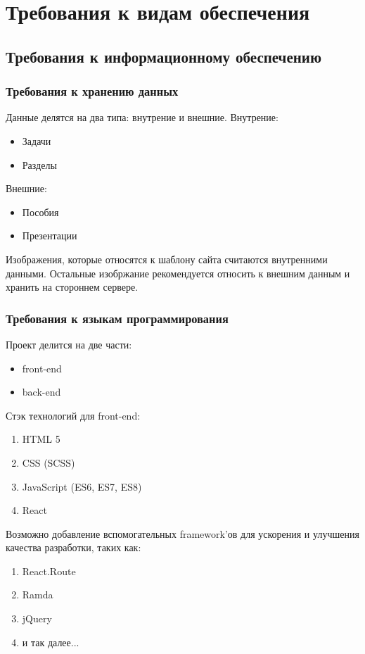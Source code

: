 \section{Требования к видам обеспечения}
\subsection{Требования к информационному обеспечению}
\subsubsection{Требования к хранению данных}
Данные делятся на два типа: внутрение и внешние.
Внутрение:
\begin{itemize}
    \item Задачи
    \item Разделы
\end{itemize}
Внешние:
\begin{itemize}
    \item Пособия
    \item Презентации
\end{itemize}

Изображения, которые относятся к шаблону сайта считаются внутренними данными. Остальные изобржание рекомендуется относить к внешним данным и хранить на стороннем сервере.
\subsubsection{Требования к языкам программирования}
Проект делится на две части:
\begin{itemize}
    \item front-end
    \item back-end
\end{itemize}
Стэк технологий для front-end:
\begin{enumerate}
    \item HTML 5
    \item CSS (SCSS)
    \item JavaScript (ES6, ES7, ES8)
    \item React
\end{enumerate}
Возможно добавление вспомогательных framework'ов для ускорения и улучшения качества разработки, таких как:
\begin{enumerate}
    \item React.Route
    \item Ramda
    \item jQuery
    \item и так далее...
\end{enumerate}
